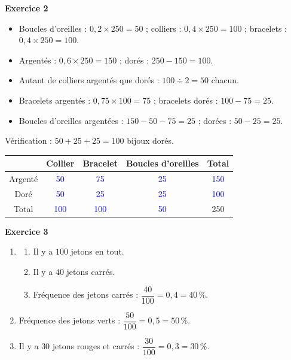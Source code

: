 \documentclass[a4paper,11pt]{article}
\newenvironment{exercice}[1]{%
  \Needspace{6\baselineskip}\par\bigskip\noindent\textbf{Exercice #1}\par\smallskip\noindent\ignorespaces
}{%
  \par
}
\newcommand{\val}[1]{\textcolor{blue}{#1}}
\begin{document}
\begin{exercice}{2}
\begin{itemize}[label=$\bullet$]
\item Boucles d'oreilles : $0{,}2\times 250=50$ ; colliers : $0{,}4\times 250=100$ ; bracelets : $0{,}4\times 250=100$.
\item Argentés : $0{,}6\times 250=150$ ; dorés : $250-150=100$.
\item Autant de colliers argentés que dorés : $100\div 2=50$ chacun.
\item Bracelets argentés : $0{,}75\times 100=75$ ; bracelets dorés : $100-75=25$.
\item Boucles d'oreilles argentées : $150-50-75=25$ ; dorées : $50-25=25$.
\end{itemize}
Vérification : $50+25+25=100$ bijoux dorés.

\begin{center}
\begin{tabular}{|c|c|c|c|c|}
\hline
 & Collier & Bracelet & Boucles d'oreilles & Total \\ \hline
Argenté & \val{50} & \val{75} & \val{25} & \val{150} \\ \hline
Doré & \val{50} & \val{25} & \val{25} & \val{100} \\ \hline
Total & \val{100} & \val{100} & \val{50} & 250 \\ \hline
\end{tabular}
\end{center}
\end{exercice}

\begin{exercice}{3}
\begin{enumerate}[label=\arabic*.]
\item
\begin{enumerate}[label=(\alph*)]
\item Il y a $100$ jetons en tout.
\item Il y a $40$ jetons carrés.
\item Fréquence des jetons carrés : $\dfrac{40}{100}=0{,}4=40\,\%$.
\end{enumerate}
\item Fréquence des jetons verts : $\dfrac{50}{100}=0{,}5=50\,\%$.
\item Il y a $30$ jetons rouges et carrés : $\dfrac{30}{100}=0{,}3=30\,\%$.
\end{enumerate}
\end{exercice}
\end{document}
